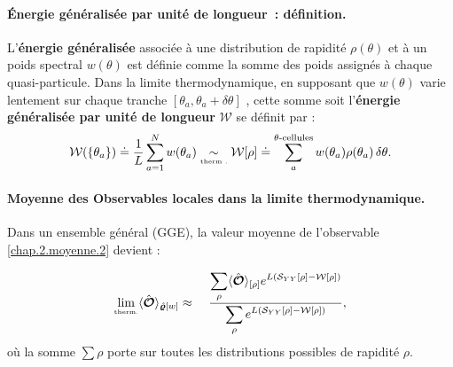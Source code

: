 

\paragraph{Énergie généralisée par unité de longueur : définition.}

L’\textbf{énergie généralisée} associée à une distribution de rapidité $\rho(\theta)$ et à un poids spectral $w(\theta)$ est définie comme la somme des poids assignés à chaque quasi-particule. 
Dans la limite thermodynamique, en supposant que $w(\theta)$ varie lentement sur chaque tranche $[\theta_a, \theta_a + \delta\theta]$ ,  cette somme soit l’\textbf{énergie généralisée par unité de longueur} $\mathcal{W}$ se définit par :
\begin{eqnarray}
	\mathcal{W}(\{\theta_a\}) \doteq  \frac{1}{L} \sum_{a = 1}^N w(\theta_a) 
	 \underset{\mbox{\tiny therm .}}{\sim}  \mathcal{W}[\rho]  \doteq  \sum_a^{\theta\text{-cellules}} w(\theta_a) \rho(\theta_a)\, \delta\theta. 
\end{eqnarray} 


\paragraph{Moyenne des Observables locales dans la limite thermodynamique.}

Dans un ensemble général (GGE), la valeur moyenne de l’observable \eqref{chap.2.moyenne.2} devient :	
	
\begin{eqnarray}\label{chap.2.moyenne.3}
	\underset{\mbox{\tiny therm.}}{\lim} \langle \hat{\bm{\mathcal{O}}} \rangle_{\hat{\bm{\varrho}}[w]} &  \approx &  ~ \frac{  \displaystyle \sum_{\rho }  \langle \hat{\bm{\mathcal{O}}}\rangle_{[\rho]}  e^{L(\mathcal{S}_{YY}[\rho] -  \mathcal{W}[\rho]) }}{ \displaystyle \sum_{\rho } e^{L(\mathcal{S}_{YY}[\rho] -  \mathcal{W}[\rho]) } },
\end{eqnarray}
où la somme $\sum\rho$ porte sur toutes les distributions possibles de rapidité $\rho$.

